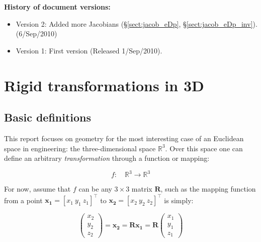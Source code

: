 \documentclass[a4paper,11pt]{report}
\begin{document}
\newpage


\textbf{History of document versions:}
\begin{itemize}
 \item Version 2: Added more Jacobians (\S\ref{sect:jacob_eDp}, \S\ref{sect:jacob_eDp_inv}). (6/Sep/2010)
 \item Version 1: First version (Released 1/Sep/2010).
\end{itemize}


\newpage

\tableofcontents


\chapter{Rigid transformations in 3D}


\section{Basic definitions}
\label{sect:basic}

This report focuses on geometry for the most interesting case of an Euclidean space in 
engineering: the three-dimensional space $\mathbb{R}^3$. 
Over this space one can define an arbitrary \emph{transformation} through 
a function or mapping:

\begin{equation}
 f: \quad \mathbb{R}^3 \rightarrow \mathbb{R}^3
\end{equation}

For now, assume that $f$ can be any $3 \times 3$ matrix $\mathbf{R}$, 
such as the mapping function 
from a point $\mathbf{x_1}=[x_1 ~ y_1 ~ z_1]^\top$ to $\mathbf{x_2}=[x_2 ~ y_2 ~ z_2]^\top$ is simply:

\begin{equation}
\left(
\begin{array}{c}
 x_2 \\ y_2 \\ z_2
\end{array}
\right)
=
 \mathbf{x_2} 
= 
\mathbf{R} \mathbf{x_1}
=
\mathbf{R} 
\left(
\begin{array}{c}
 x_1 \\ y_1 \\ z_1
\end{array}
\right)
\end{equation}
\end{document}
